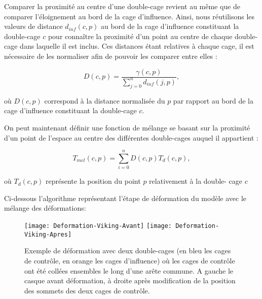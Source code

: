 Comparer la proximité au centre d'une double-cage revient au même que de
comparer l'éloignement au bord de la cage d'influence. Ainsi, nous réutilisons
les valeurs de distance $d_{inf}(c, p)$ au bord de la cage d'influence
constituant la double-cage $c$ pour connaître la proximité d'un point au
centre de chaque double-cage dans laquelle il est inclus. Ces distances étant
relatives à chaque cage, il est nécessaire de les normaliser afin de pouvoir
les comparer entre elles :

\begin{displaymath}
  D(c, p) = \frac{\gamma(c, p)}{\sum_{j=0}^n d_{inf}(j, p)}, 
\end{displaymath}

où $D(c, p)$ correspond à la distance normalisée du $p$ par rapport au
bord de la cage d'influence constituant la double-cage $c$.

On peut maintenant définir une fonction de mélange se basant sur la proximité
d'un point de l'espace au centre des différentes double-cages auquel il
appartient :

\begin{displaymath}
  T_{mel}(c, p) = \sum_{i=0}^n D(c, p) T_{d}(c, p),
\end{displaymath}

où $T_{d}(c, p)$ représente la position du point $p$ relativement à la double-
cage $c$

Ci-dessous l'algorithme représentant l'étape de déformation du modèle avec le
mélange des déformations: \\


\begin{figure}[ht]
  \begin{center}
    \texttt{[image: Deformation-Viking-Avant]}
    \texttt{[image: Deformation-Viking-Apres]}

    \caption[Exemple de déformation double-cages] {Exemple de déformation avec
deux double-cages (en bleu les cages de contrôle, en orange les cages
d'influence) où les cages de contrôle ont été collées ensembles le long d'une
arête commune. A gauche le casque avant déformation, à droite après
modification de la position des sommets des deux cages de contrôle.}

  \end{center}
\end{figure}